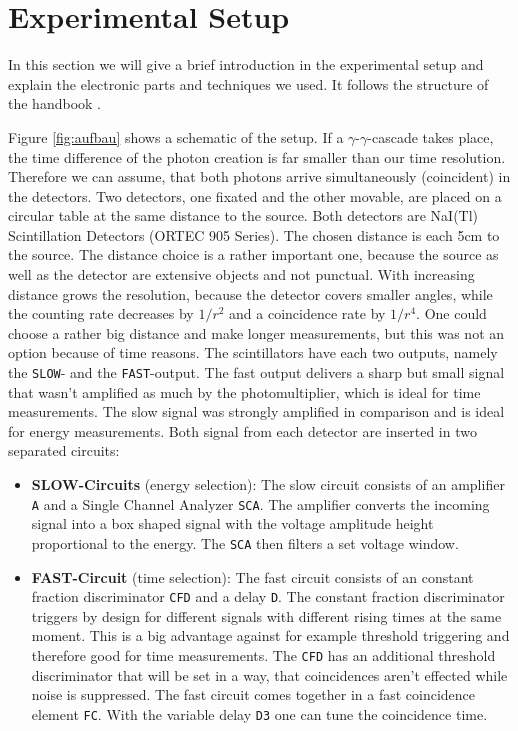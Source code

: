 \documentclass[11pt,a4paper,notitlepage]{scrartcl}
\begin{document}
\section{Experimental Setup}
\label{sec:exp}
In this section we will give a brief introduction in the experimental setup and explain the electronic parts and techniques we used. It follows the structure of the handbook \cite{manual}.

Figure \ref{fig:aufbau} shows a schematic of the setup. If a $\gamma$-$\gamma$-cascade takes place, the time difference of the photon creation is far smaller than our time resolution. Therefore we can assume, that both photons arrive simultaneously (coincident) in the detectors. Two detectors, one fixated and the other movable, are placed on a circular table at the same distance to the source. Both detectors are NaI(Tl) Scintillation Detectors (ORTEC 905 Series). The chosen distance is each 5cm to the source. The distance choice is a rather important one, because the source as well as the detector are extensive objects and not punctual. With increasing distance grows the resolution, because the detector covers smaller angles, while the counting rate decreases by $1/r^2$ and a coincidence rate by $1/r^4$. One could choose a rather big distance and make longer measurements, but this was not an option because of time reasons. The scintillators have each two outputs, namely the \texttt{SLOW}- and the \texttt{FAST}-output. The fast output delivers a sharp but small signal that wasn't amplified as much by the photomultiplier, which is ideal for time measurements. The slow signal was strongly amplified in comparison and is ideal for energy measurements. Both signal from each detector are inserted in two separated circuits:
\begin{itemize}
	\item \textbf{SLOW-Circuits} (energy selection):  The slow circuit consists of an amplifier \texttt{A} and a Single Channel Analyzer \texttt{SCA}. The amplifier converts the incoming signal into a box shaped signal with the voltage amplitude height proportional to the energy. The \texttt{SCA} then filters a set voltage window.
	\item \textbf{FAST-Circuit} (time selection): The fast circuit consists of an constant fraction discriminator \texttt{CFD} and a delay \texttt{D}. The constant fraction discriminator triggers by design for different signals with different rising times at the same moment. This is a big advantage against for example threshold triggering and therefore good for time measurements. The \texttt{CFD} has an additional threshold discriminator that will be set in a way, that coincidences aren't effected while noise is suppressed. The fast circuit comes together in a fast coincidence element \texttt{FC}. With the variable delay \texttt{D3}  one can tune the coincidence time.
\end{itemize}
\end{document}
